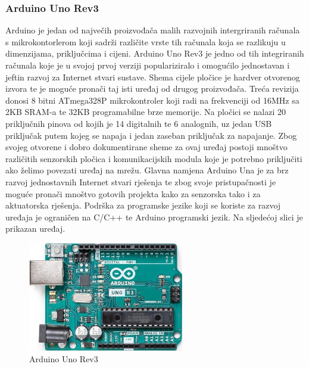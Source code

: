 \documentclass[times, utf8, diplomski]{fer}
\begin{document}
\subsubsection{Arduino Uno Rev3}
Arduino je jedan od največih proizvođača malih razvojnih intergriranih računala s mikrokontorlerom koji sadrži različite vrste tih računala koja se razlikuju u dimenzijama, priključcima i cijeni. Arduino Uno Rev3\citep{ArduinoUno} je jedno od tih integriranih računala koje je u svojoj prvoj verziji populariziralo i omogućilo jednostavan i jeftin razvoj za Internet stvari sustave. Shema cijele pločice je hardver otvorenog izvora te je moguće pronači taj isti uređaj od drugog proizvođača. Treća revizija donosi 8 bitni ATmega328P mikrokontroler koji radi na frekvenciji od 16MHz sa 2KB SRAM-a te 32KB programabilne brze memorije. Na pločici se nalazi 20 priključnih pinova od kojih je 14 digitalnih te 6 analognih, uz jedan USB priključak putem kojeg se napaja i jedan zaseban priključak za napajanje. Zbog svojeg otvorene i dobro dokumentirane sheme za ovaj uređaj postoji mnoštvo različitih senzorskih pločica i komunikacijskih modula koje je potrebno priključiti ako želimo povezati uređaj na mrežu. Glavna namjena Arduino Una je za brz razvoj jednostavnih Internet stvari rješenja te zbog svoje pristupačnosti je moguće pronači mnoštvo gotovih projekta kako za senzorska tako i za aktuatorska rješenja. Podrška za programske jezike koji se koriste za razvoj uređaja je ograničen na C/C++ te Arduino programski jezik. Na sljedećoj slici je prikazan uređaj. 
\begin{figure}[htb]
    \centering
    \includegraphics[width=6.8cm]{images/arduinouno.jpg}
    \caption{Arduino Uno Rev3\citep{ArduinoUno}}
    \label{fig:arduinouno}
\end{figure}
\end{document}
